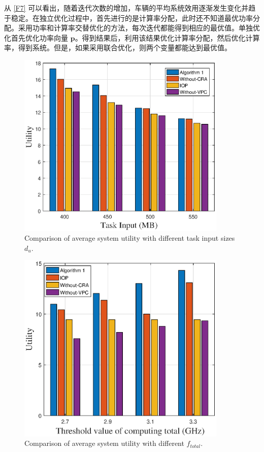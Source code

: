 从 \ref{F7} 可以看出，随着迭代次数的增加，车辆的平均系统效用逐渐发生变化并趋于稳定。在独立优化过程中，首先进行的是计算率分配，此时还不知道最优功率分配。采用功率和计算率交替优化的方法，每次迭代都能得到相应的最优值。单独优化首先优化功率向量 $\mathbf{p}$。得到结果后，利用该结果优化计算率分配，然后优化计算率，得到系统。但是，如果采用联合优化，则两个变量都能达到最优值。
\begin{figure}[H]
\centering
\includegraphics[width=10cm]{figures//chap3//diff_dup.eps}
\caption{Comparison of average system utility with different task input sizes $d_u$.}
\label{F8}
\end{figure}
\begin{figure}[H]
\centering
\includegraphics[width=10cm]{figures//chap3//diff_total.eps}
\caption{Comparison of average system utility with different $f_{total}$.}
\label{F9}
\end{figure}
